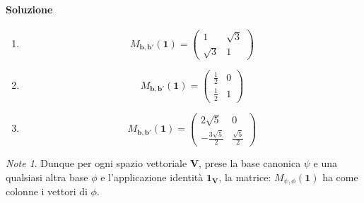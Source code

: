 \documentclass{article}
\theoremstyle{plain}
\theoremstyle{definition}
\theoremstyle{remark}
\newtheorem{note}{Note}
\begin{document}
\paragraph{Soluzione}
\begin{enumerate}
    \item \[M_{\mathbf{b},\mathbf{b}'}(\mathbf{1})=
    \begin{pmatrix}
         1&\sqrt{3} \\
         \sqrt{3}&1
    \end{pmatrix} 
    \]

    \item \[M_{\mathbf{b},\mathbf{b}'}(\mathbf{1})=
    \begin{pmatrix}
         \frac{1}{2}&0 \\
         \frac{1}{2}&1
    \end{pmatrix} 
    \]

    \item \[M_{\mathbf{b},\mathbf{b}'}(\mathbf{1})=
    \begin{pmatrix}
         2\sqrt{5}&0 \\
         -\frac{3\sqrt{5}}{2}&\frac{\sqrt{5}}{2}
    \end{pmatrix} 
    \]
\end{enumerate}

\vspace{10pt}

\begin{note}
    Dunque per ogni spazio vettoriale $\mathbf{V}$, prese la base canonica $\psi$ e una qualsiasi altra base $\phi$ e l'applicazione identità $\mathbf{1_V}$, la matrice:
    $M_{\psi,\phi}(\mathbf{1})$ ha come colonne i vettori di $\phi$.
\end{note}

\vspace{10pt}
\end{document}
